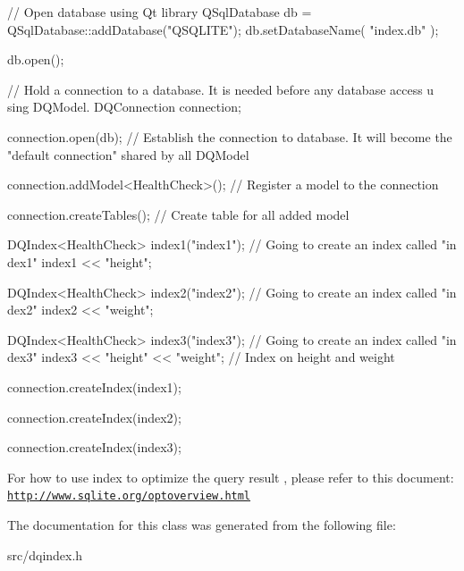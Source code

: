 \begin{DoxyCode}
    // Open database using Qt library
    QSqlDatabase db = QSqlDatabase::addDatabase("QSQLITE");
    db.setDatabaseName( "index.db" );

    db.open();

    // Hold a connection to a database. It is needed before any database access u
      sing DQModel.
    DQConnection connection;

    connection.open(db); // Establish the connection to database. It will become 
      the "default connection" shared by all DQModel

    connection.addModel<HealthCheck>(); // Register a model to the connection

    connection.createTables(); // Create table for all added model

    DQIndex<HealthCheck> index1("index1"); // Going to create an index called "in
      dex1"
    index1 << "height";

    DQIndex<HealthCheck> index2("index2"); // Going to create an index called "in
      dex2"
    index2 << "weight";

    DQIndex<HealthCheck> index3("index3"); // Going to create an index called "in
      dex3"
    index3 << "height" << "weight"; // Index on height and weight

    connection.createIndex(index1);

    connection.createIndex(index2);

    connection.createIndex(index3);
\end{DoxyCode}


For how to use index to optimize the query result , please refer to this document: \href{http://www.sqlite.org/optoverview.html}{\tt http://www.sqlite.org/optoverview.html} 

The documentation for this class was generated from the following file:\begin{DoxyCompactItemize}
\item 
src/dqindex.h\end{DoxyCompactItemize}
